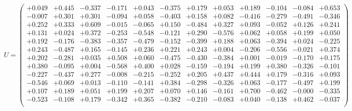 \documentclass[9pt]{article}
\theoremstyle{plain}
\theoremstyle{definition}
\theoremstyle{remark}
\numberwithin{equation}{section}
\begin{document}
$U = \left(
\begin{array}{
cccccccccccc}
+0.049 & +0.445 & -0.337 & -0.171 & +0.043 & -0.375 & +0.179 & +0.053 & +0.189 & -0.104 & -0.084 & +0.653 \\
-0.007 & +0.301 & +0.301 & -0.094 & +0.058 & -0.403 & +0.158 & +0.082 & -0.416 & -0.279 & -0.491 & -0.346 \\
+0.252 & +0.333 & +0.609 & -0.015 & -0.065 & +0.150 & -0.484 & +0.327 & +0.093 & -0.052 & +0.126 & +0.241 \\
+0.131 & +0.024 & +0.372 & -0.253 & -0.548 & -0.121 & +0.290 & -0.576 & +0.062 & +0.058 & +0.199 & +0.050 \\
+0.192 & -0.176 & -0.383 & -0.357 & -0.479 & -0.152 & -0.399 & +0.188 & +0.063 & -0.394 & +0.024 & -0.225 \\
+0.243 & -0.487 & +0.165 & -0.145 & +0.236 & +0.221 & +0.243 & +0.004 & -0.206 & -0.556 & -0.021 & +0.374 \\
+0.202 & -0.281 & +0.035 & +0.508 & +0.060 & -0.475 & -0.430 & -0.384 & +0.001 & -0.019 & -0.170 & +0.175 \\
+0.380 & -0.095 & +0.004 & -0.568 & +0.400 & +0.028 & -0.159 & -0.194 & +0.199 & +0.380 & -0.326 & -0.101 \\
-0.227 & -0.437 & +0.277 & -0.008 & -0.215 & -0.252 & +0.205 & +0.437 & +0.444 & +0.179 & -0.316 & +0.093 \\
-0.546 & +0.069 & +0.013 & -0.110 & -0.141 & +0.384 & -0.298 & -0.326 & +0.063 & -0.177 & -0.497 & +0.199 \\
+0.107 & +0.189 & +0.051 & +0.199 & +0.207 & +0.070 & +0.146 & -0.161 & +0.700 & -0.462 & -0.000 & -0.335 \\
-0.523 & -0.108 & +0.179 & -0.342 & +0.365 & -0.382 & -0.210 & -0.083 & +0.040 & -0.138 & +0.462 & -0.037 \\
\end{array}
\right)$ \newline 
\end{document}
